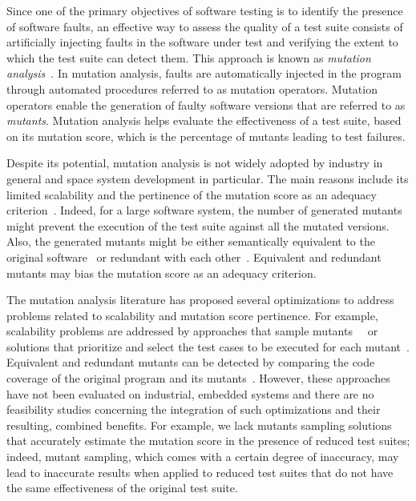 Since one of the primary objectives of software testing is to identify the presence of software faults, an effective way to assess the quality of a test suite consists of artificially injecting faults in the software under test and verifying the extent to which the test suite can detect them. 
This approach is known as \emph{mutation analysis}~\cite{DeMillo78}. 
In mutation analysis, faults are automatically injected in the program through automated procedures referred to as mutation operators. Mutation operators enable the generation of faulty software versions that are referred to as \emph{mutants}.  
Mutation analysis helps evaluate the effectiveness of a test suite,  based on its mutation score, which is the percentage of mutants leading to test failures.

Despite its potential, mutation analysis is not widely adopted by industry in general and space system development in particular. The main reasons include its limited scalability and the pertinence of the mutation score as an adequacy criterion~\cite{papadakis2016threats}. Indeed, for a large software system, the number of generated mutants might prevent the execution of the test suite against all the mutated versions. Also, the generated mutants might be either 
semantically equivalent to the original software~\cite{madeyski2013overcoming} or redundant with each other~\cite{Shin:TSE:DCriterion:2018}.
Equivalent and redundant mutants may bias the mutation score as an adequacy criterion. 

The mutation analysis literature has proposed several optimizations to address problems related to scalability and mutation score pertinence. 
For example, scalability problems are addressed by approaches that sample mutants~\cite{zhang2013operator}~\cite{gopinath2015hard}
or solutions that prioritize and select the test cases to be executed for each mutant~\cite{zhang2013faster}. Equivalent and redundant mutants can be detected by comparing the code coverage of the original program and its mutants~\cite{grun2009impact,schuler2010covering,schuler2013covering,schuler2009efficient}. 
However, these approaches 
have not been evaluated on industrial, embedded systems
and there are no feasibility studies concerning the integration of such optimizations and their resulting, combined benefits.
For example, we lack mutants sampling solutions that accurately estimate the mutation score in the presence of reduced test suites;
indeed, mutant sampling, which comes with a certain degree of inaccuracy, may lead to inaccurate results when applied to reduced test suites that do not have the same effectiveness of the original test suite.

